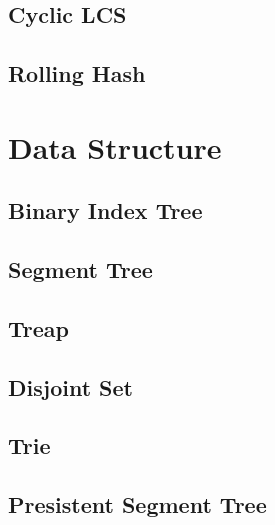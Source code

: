 \documentclass[a4paper,10pt,twocolumn,oneside]{article}
\begin{document}
\subsection{Cyclic LCS}


\subsection{Rolling Hash}


\section{Data Structure}

\subsection{Binary Index Tree}


\subsection{Segment Tree}


\subsection{Treap}


%

\subsection{Disjoint Set}


\subsection{Trie}


\subsection{Presistent Segment Tree}

\end{document}
